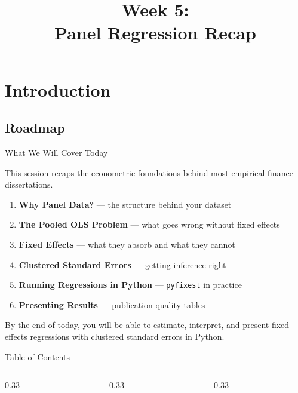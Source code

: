 \documentclass[9pt,aspectratio=169]{beamer}
\title{\LARGE \textnormal{Week 5: \\
Panel Regression Recap}}
\begin{document}
\begin{frame}[plain]
\titlepage
\end{frame}


\section{Introduction}
\subsection{Roadmap}

\begin{frame}{What We Will Cover Today}

This session recaps the \alert{econometric foundations} behind most empirical finance dissertations.

\medskip

\begin{enumerate}
    \item \textbf{Why Panel Data?} --- the structure behind your dataset
    \item \textbf{The Pooled OLS Problem} --- what goes wrong without fixed effects
    \item \textbf{Fixed Effects} --- what they absorb and what they cannot
    \item \textbf{Clustered Standard Errors} --- getting inference right
    \item \textbf{Running Regressions in Python} --- \texttt{pyfixest} in practice
    \item \textbf{Presenting Results} --- publication-quality tables
\end{enumerate}

\medskip

\begin{highlightbox}
\centering
By the end of today, you will be able to estimate, interpret, and present fixed effects regressions with clustered standard errors in Python.
\end{highlightbox}

\end{frame}


\begin{frame}{Table of Contents}
\footnotesize
\begin{columns}[t]
  \begin{column}{0.33\textwidth}
    \tableofcontents[sections={1-3}]
  \end{column}
  \begin{column}{0.33\textwidth}
    \tableofcontents[sections={4-6}]
  \end{column}
  \begin{column}{0.33\textwidth}
    \tableofcontents[sections={7-8}]
  \end{column}
\end{columns}
\end{frame}
\end{document}
